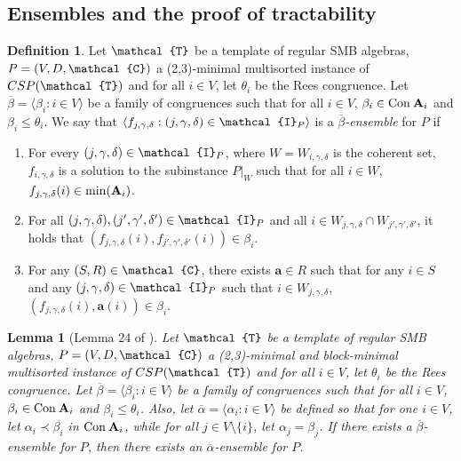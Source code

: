 \documentclass[11pt]{amsart}
\newcommand{\m}[1]{{\uppercase {\mathbf {#1}}}}
\newcommand{\vr}[1]{{\uppercase {\mathcal{#1}}}}
\newcommand{\con}{{\rm Con\:}}
\newcommand{\cn}[1]{{\con\m {#1}}}
\newcommand{\lb}{\langle}
\newcommand{\rb}{\rangle}
\newtheorem{lm}[thm]{Lemma}
\theoremstyle{definition}
\newtheorem{df}[thm]{Definition}
\begin{document}
\subsection{Ensembles and the proof of tractability}

\begin{df}\label{ensembledef}
Let $\vr t$ be a template of regular SMB algebras, $P=(V,D,\vr c)$ a (2,3)-minimal multisorted instance of $CSP(\vr t)$ and for all $i\in V$, let $\theta_i$ be the Rees congruence. Let $\overline{\beta}=\lb \beta_i:i\in V\rb$ be a family of congruences such that for all $i\in V$, $\beta_i\in\cn A_i$ and $\beta_i\leq \theta_i$. We say that $\lb f_{j,\gamma,\delta}:(j,\gamma,\delta)\in \vr i_P\rb$ is a {\em $\overline{\beta}$-ensemble} for $P$ if 
\begin{enumerate}
\item For every $(j,\gamma,\delta)\in \vr i_P$, where $W=W_{i,\gamma,\delta}$ is the coherent set, $f_{i,\gamma,\delta}$ is a solution to the subinstance $P|_W$ such that for all $i\in W$, $f_{j,\gamma,\delta}(i)\in\mathrm{min}(\m a_i)$.
\item For all $(j,\gamma,\delta),(j',\gamma',\delta')\in \vr i_P$ and all $i\in W_{j,\gamma,\delta}\cap W_{j',\gamma',\delta'}$, it holds that $(f_{j,\gamma,\delta}(i),f_{j',\gamma',\delta'}(i))\in\beta_i$.
\item For any $(S,R)\in \vr c$, there exists $\mathbf{a}\in R$ such that for any $i\in S$ and any $(j,\gamma,\delta)\in \vr i_P$ such that $i\in W_{j,\gamma,\delta}$, $(f_{j,\gamma,\delta}(i),\mathbf{a}(i))\in\beta_i$.
\end{enumerate}
\end{df}

\begin{lm}[Lemma 24 of \cite{BuSMB}]\label{tightenensemble}
Let $\vr t$ be a template of regular SMB algebras, $P=(V,D,\vr c)$ a (2,3)-minimal and block-minimal multisorted instance of $CSP(\vr t)$ and for all $i\in V$, let $\theta_i$ be the Rees congruence. Let $\overline{\beta}=\lb \beta_i:i\in V\rb$ be a family of congruences such that for all $i\in V$, $\beta_i\in\cn A_i$ and $\beta_i\leq \theta_i$. Also, let $\overline{\alpha}=\lb \alpha_i:i\in V\rb$ be defined so that for one $i\in V$, let $\alpha_i\prec \beta_i$ in $\cn a_i$, while for all $j\in V\setminus\{i\}$, let $\alpha_j=\beta_j$. If there exists a $\overline{\beta}$-ensemble for $P$, then there exists an $\overline{\alpha}$-ensemble for $P$.
\end{lm}
\end{document}
